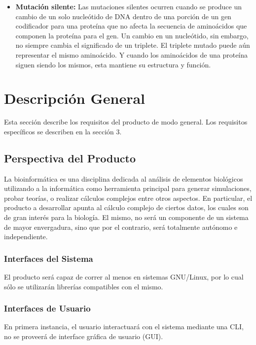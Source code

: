 \documentclass[12pt,a4paper,english,spanish]{article}
\begin{document}
\begin{itemize}
	\item \textbf{Mutación silente:} Las mutaciones silentes ocurren cuando se produce un cambio de un solo nucleótido de DNA dentro de una porción de un 										gen codificador para una proteína que no afecta la secuencia de aminoácidos que componen la proteína para el gen. Un 										cambio en un nucleótido, sin embargo, no siempre cambia el significado de un triplete. El triplete mutado puede aún 									representar el mismo aminoácido. Y cuando los aminoácidos de una proteína siguen siendo los mismos, esta mantiene su 										estructura y función.				

\end{itemize}

\section{Descripción General}
\label{section-desc-gral}
Esta sección describe los requisitos del producto de modo general. Los
requisitos específicos se describen en la sección 3.

\subsection{Perspectiva del Producto}
La bioinformática es una disciplina dedicada al análisis de elementos biológicos utilizando a la informática como herramienta principal para generar simulaciones, probar teorías, o realizar cálculos complejos entre otros aspectos. En particular, el producto a desarrollar apunta al cálculo complejo de ciertos datos, los cuales son de gran interés para la biología. El mismo, no será un componente de un sistema de mayor envergadura, sino que por el contrario, será totalmente autónomo e independiente. 

	\subsubsection{Interfaces del Sistema}
		El producto será capaz de correr al menos en sistemas GNU/Linux, por lo cual sólo se utilizarán librerías 			compatibles con el mismo.

	\subsubsection{Interfaces de Usuario}		
		En primera instancia, el usuario interactuará con el sistema mediante una CLI, no se proveerá de interface gráfica de usuario (GUI).
\end{document}
